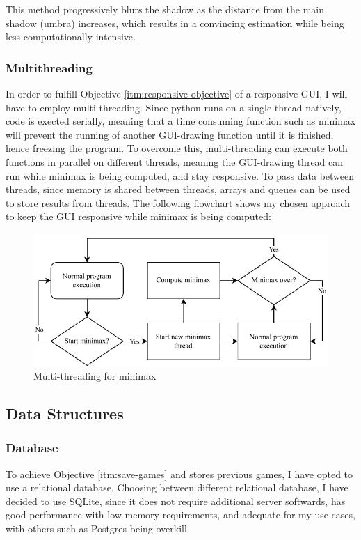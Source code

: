 \documentclass[../main/main.tex]{subfiles}
\begin{document}
This method progressively blurs the shadow as the distance from the main shadow (umbra) increases, which results in a convincing estimation while being less computationally intensive.

\subsubsection{Multithreading}
In order to fulfill Objective \ref{itm:responsive-objective} of a responsive GUI, I will have to employ multi-threading. Since python runs on a single thread natively, code is exected serially, meaning that a time consuming function such as minimax will prevent the running of another GUI-drawing function until it is finished, hence freezing the program. To overcome this, multi-threading can execute both functions in parallel on different threads, meaning the GUI-drawing thread can run while minimax is being computed, and stay responsive. To pass data between threads, since memory is shared between threads, arrays and queues can be used to store results from threads. The following flowchart shows my chosen approach to keep the GUI responsive while minimax is being computed:

\begin{figure}[H]
    \centering
    \includegraphics[width=\columnwidth]{../design/assets/multi_threading.pdf}
    \caption{Multi-threading for minimax}
    \label{fig:multi-threading}
\end{figure}

\subsection{Data Structures}
\subsubsection{Database}
To achieve Objective \ref{itm:save-games} and stores previous games, I have opted to use a relational database. Choosing between different relational database, I have decided to use SQLite, since it does not require additional server softwards, has good performance with low memory requirements, and adequate for my use cases, with others such as Postgres being overkill.
\end{document}
